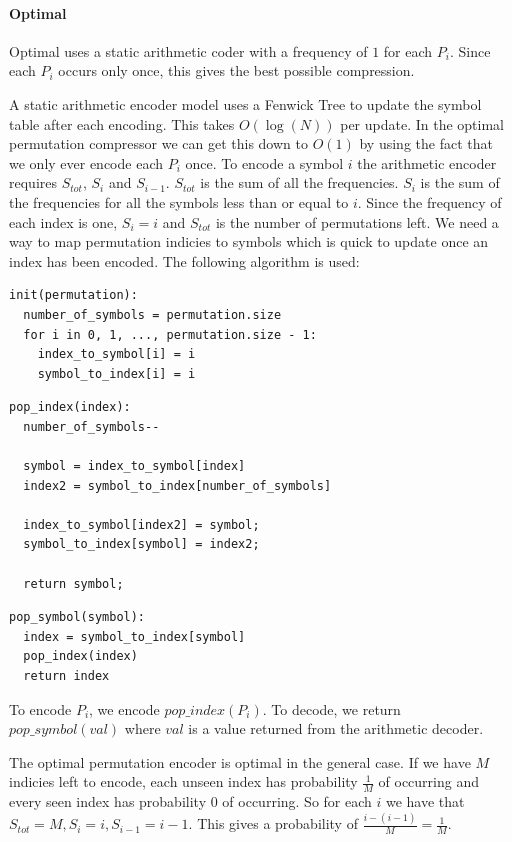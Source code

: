 \documentclass{report}
\begin{document}
\paragraph{Optimal}
Optimal uses a static arithmetic coder with a frequency of $1$ for each
$P_i$. Since each $P_i$ occurs only once, this gives the best possible
compression.

A static arithmetic encoder model uses a Fenwick Tree to update the symbol
table after each encoding. This takes $O(\log(N))$ per update. In the optimal
permutation compressor we can get this down to $O(1)$ by using the fact that
we only ever encode each $P_i$ once. To encode a symbol $i$ the arithmetic
encoder requires $S_{tot}$, $S_i$ and $S_{i-1}$. $S_{tot}$ is the sum of all
the frequencies. $S_i$ is the sum of the frequencies for all the symbols less
than or equal to $i$. Since the frequency of each index is one, $S_i = i$ and
$S_{tot}$ is the number of permutations left. We need a way to map permutation
indicies to symbols which is quick to update once an index has been
encoded. The following algorithm is used:

\begin{verbatim}
init(permutation):
  number_of_symbols = permutation.size
  for i in 0, 1, ..., permutation.size - 1:
    index_to_symbol[i] = i
    symbol_to_index[i] = i
\end{verbatim}

\begin{verbatim}
pop_index(index):
  number_of_symbols--

  symbol = index_to_symbol[index]
  index2 = symbol_to_index[number_of_symbols]

  index_to_symbol[index2] = symbol;
  symbol_to_index[symbol] = index2;

  return symbol;
\end{verbatim}

\begin{verbatim}
pop_symbol(symbol):
  index = symbol_to_index[symbol]
  pop_index(index)
  return index
\end{verbatim}

To encode $P_i$, we encode $pop\_index(P_i)$. To decode, we return
$pop\_symbol(val)$ where $val$ is a value returned from the arithmetic
decoder.

The optimal permutation encoder is optimal in the general case. If we have $M$
indicies left to encode, each unseen index has probability $\frac{1}{M}$ of
occurring and every seen index has probability $0$ of occurring. So for each
$i$ we have that $S_{tot}=M, S_i = i, S_{i-1} = i-1$. This gives a probability
of $\frac{i-(i-1)}{M} = \frac{1}{M}$.
\end{document}
